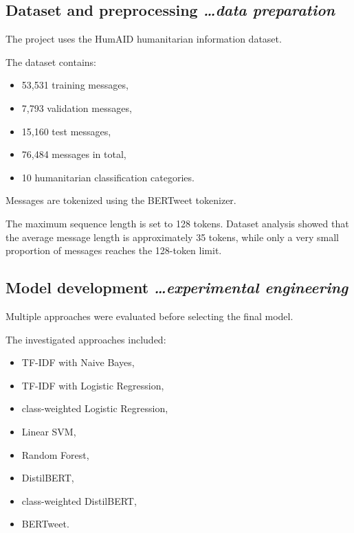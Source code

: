 \documentclass[11pt,a4paper]{article}
\newcommand{\BvrHint}[1]{%
  {\normalfont\normalsize\itshape\hfill #1}}
\begin{document}
\subsection{Dataset and preprocessing %
\BvrHint{\ldots data preparation}}

The project uses the HumAID humanitarian information dataset.

The dataset contains:

\begin{itemize}[leftmargin=0.7cm]

    \item 53,531 training messages,
    \item 7,793 validation messages,
    \item 15,160 test messages,
    \item 76,484 messages in total,
    \item 10 humanitarian classification categories.

\end{itemize}

Messages are tokenized using the BERTweet tokenizer.

The maximum sequence length is set to 128 tokens. Dataset analysis showed that
the average message length is approximately 35 tokens, while only a very
small proportion of messages reaches the 128-token limit.

\subsection{Model development %
\BvrHint{\ldots experimental engineering}}

Multiple approaches were evaluated before selecting the final model.

The investigated approaches included:

\begin{itemize}[leftmargin=0.7cm]

    \item TF-IDF with Naive Bayes,
    \item TF-IDF with Logistic Regression,
    \item class-weighted Logistic Regression,
    \item Linear SVM,
    \item Random Forest,
    \item DistilBERT,
    \item class-weighted DistilBERT,
    \item BERTweet.

\end{itemize}
\end{document}
